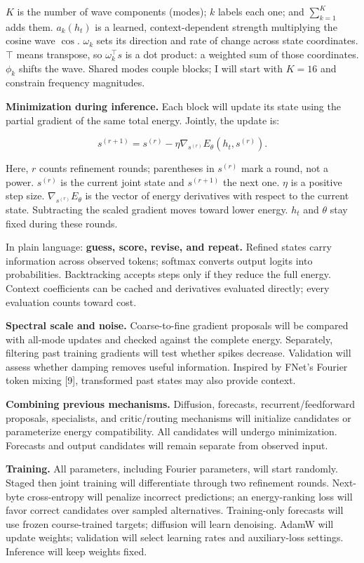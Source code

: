 \documentclass[11pt,letterpaper]{article}
\begin{document}
\(K\) is the number of wave components (modes); \(k\) labels each one; and \(\sum_{k=1}^{K}\) adds them. \(a_k(h_t)\) is a learned, context-dependent strength multiplying the cosine wave \(\cos\). \(\omega_k\) sets its direction and rate of change across state coordinates. \(\top\) means transpose, so \(\omega_k^\top s\) is a dot product: a weighted sum of those coordinates. \(\phi_k\) shifts the wave. Shared modes couple blocks; I will start with \(K=16\) and constrain frequency magnitudes.

\textbf{Minimization during inference.} Each block will update its state using the partial gradient of the same total energy. Jointly, the update is:

\[
s^{(r+1)}=s^{(r)}-\eta\nabla_{s^{(r)}}E_\theta(h_t,s^{(r)}).
\]

Here, \(r\) counts refinement rounds; parentheses in \(s^{(r)}\) mark a round, not a power. \(s^{(r)}\) is the current joint state and \(s^{(r+1)}\) the next one. \(\eta\) is a positive step size. \(\nabla_{s^{(r)}}E_\theta\) is the vector of energy derivatives with respect to the current state. Subtracting the scaled gradient moves toward lower energy. \(h_t\) and \(\theta\) stay fixed during these rounds.

In plain language: \textbf{guess, score, revise, and repeat.} Refined states carry information across observed tokens; softmax converts output logits into probabilities. Backtracking accepts steps only if they reduce the full energy. Context coefficients can be cached and derivatives evaluated directly; every evaluation counts toward cost.

\textbf{Spectral scale and noise.} Coarse-to-fine gradient proposals will be compared with all-mode updates and checked against the complete energy. Separately, filtering past training gradients will test whether spikes decrease. Validation will assess whether damping removes useful information. Inspired by FNet's Fourier token mixing [9], transformed past states may also provide context.

\textbf{Combining previous mechanisms.} Diffusion, forecasts, recurrent/feedforward proposals, specialists, and critic/routing mechanisms will initialize candidates or parameterize energy compatibility. All candidates will undergo minimization. Forecasts and output candidates will remain separate from observed input.

\textbf{Training.} All parameters, including Fourier parameters, will start randomly. Staged then joint training will differentiate through two refinement rounds. Next-byte cross-entropy will penalize incorrect predictions; an energy-ranking loss will favor correct candidates over sampled alternatives. Training-only forecasts will use frozen course-trained targets; diffusion will learn denoising. AdamW will update weights; validation will select learning rates and auxiliary-loss settings. Inference will keep weights fixed.
\end{document}
